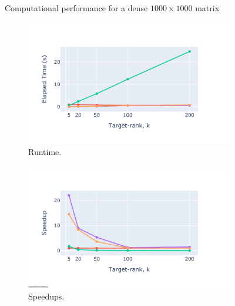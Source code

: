\documentclass[11pt,a4paper]{article}
\begin{document}
\begin{figure}[htbp]
    \caption{Computational performance for a dense $1000 \times 1000$ matrix}
    \label{fig:dense_rsvd}
\end{figure}

\begin{figure}[htbp]
    \centering
    \begin{subfigure}[b]{0.31\textwidth}
        \includegraphics[width=\textwidth, trim={100 100 100 100}, clip]{Images/svd_time_sparse.pdf}
        \caption{Runtime.}
        \label{fig:runtime}
    \end{subfigure}
    \hfill
    \begin{subfigure}[b]{0.31\textwidth}
        \includegraphics[width=\textwidth, trim={100 100 100 100}, clip]{Images/svd_speedup_sparse.pdf}
        \caption{Speedups.}
        \label{fig:speedups}
    \end{subfigure}
    \hfill
    \begin{subfigure}[b]{0.31\textwidth}

\end{subfigure}
\end{figure}
\end{document}
